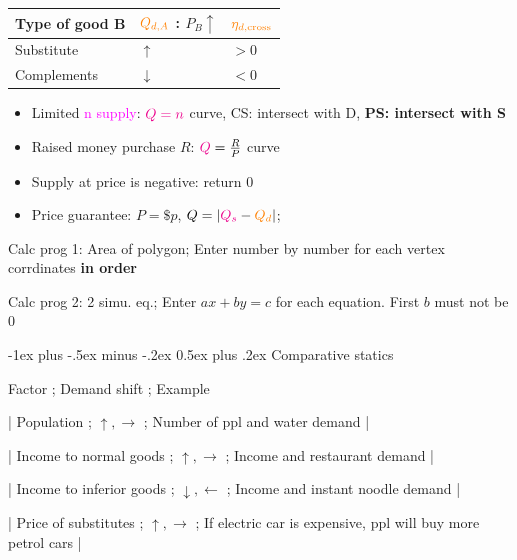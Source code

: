 \documentclass[a4paper]{article}
\makeatletter
\renewcommand{\section}{\@startsection{section}{1}{0mm}%
                                {-1ex plus -.5ex minus -.2ex}%
                                {0.5ex plus .2ex}%
                                {\normalfont\small\bfseries}}
\makeatother
\begin{document}
\begin{multicols*}{3}
        \begin{minipage}{\linewidth}
            \begin{tabular}{l|l|l}
                Type of good B & $\textcolor{orange}{Q_{d,A}}$ : $P_B \uparrow$ & $\textcolor{orange}{\eta_{d,\text{cross}}}$ \\
                \hline
                Substitute     & $\uparrow$                                     & $>0$                                        \\
                Complements    & $\downarrow$                                   & $<0$                                        \\
            \end{tabular}
        \end{minipage}

        \begin{itemize}
            \item Limited \textcolor{magenta}{n supply}: $\textcolor{magenta}{Q=n}$ curve, CS: intersect with D, \textbf{PS: intersect with S}
            \item Raised money purchase $R$: $\textcolor{magenta}{Q}=\frac{R}{P}$ curve
            \item Supply at price is negative: return 0
            \item Price guarantee: $P=\$p$, $Q=|\textcolor{magenta}{Q_s} - \textcolor{orange}{Q_d}|$;
        \end{itemize}

        Calc prog 1: Area of polygon; Enter number by number for each vertex corrdinates \textbf{in order}

        Calc prog 2: 2 simu. eq.; Enter $ax+by=c$ for each equation. First $b$ must not be 0

        \section{Comparative statics}

        Factor ; Demand shift ; Example

        | Population ; $\uparrow, \rightarrow$ ; Number of ppl and water demand |

        | Income to normal goods ; $\uparrow, \rightarrow$ ; Income and restaurant demand |

        | Income to inferior goods ; $\downarrow, \leftarrow$ ; Income and instant noodle demand |

        | Price of substitutes ; $\uparrow, \rightarrow$ ; If electric car is expensive, ppl will buy more petrol cars |


\end{multicols*}
\end{document}
